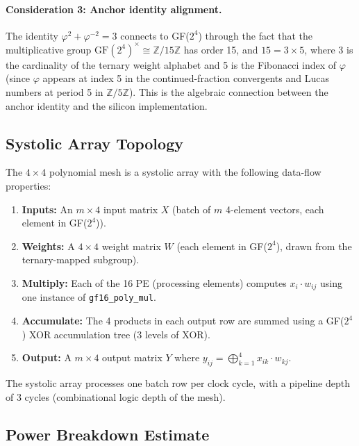 \paragraph{Consideration 3: Anchor identity alignment.}
The identity \(\varphi^{2}+\varphi^{-2}=3\) connects to GF(\(2^4\)) through
the fact that the multiplicative group \(\mathrm{GF}(2^4)^\times \cong \mathbb{Z}/15\mathbb{Z}\)
has order 15, and \(15 = 3 \times 5\), where 3 is the cardinality of the
ternary weight alphabet and 5 is the Fibonacci index of \(\varphi\)
(since \(\varphi\) appears at index 5 in the continued-fraction convergents
and Lucas numbers at period 5 in \(\mathbb{Z}/5\mathbb{Z}\)).
This is the algebraic connection between the anchor identity and the silicon implementation.

\subsection{Systolic Array Topology}

The \(4 \times 4\) polynomial mesh is a systolic array with the following
data-flow properties:

\begin{enumerate}
  \item \textbf{Inputs:} An \(m \times 4\) input matrix \(X\) (batch of \(m\)
        4-element vectors, each element in GF(\(2^4\))).
  \item \textbf{Weights:} A \(4 \times 4\) weight matrix \(W\) (each element
        in GF(\(2^4\)), drawn from the ternary-mapped subgroup).
  \item \textbf{Multiply:} Each of the 16 PE (processing elements) computes
        \(x_i \cdot w_{ij}\) using one instance of \texttt{gf16\_poly\_mul}.
  \item \textbf{Accumulate:} The 4 products in each output row are summed
        using a GF(\(2^4\)) XOR accumulation tree (3 levels of XOR).
  \item \textbf{Output:} A \(m \times 4\) output matrix \(Y\) where
        \(y_{ij} = \bigoplus_{k=1}^{4} x_{ik} \cdot w_{kj}\).
\end{enumerate}

The systolic array processes one batch row per clock cycle, with a pipeline
depth of 3 cycles (combinational logic depth of the mesh).

\subsection{Power Breakdown Estimate}


